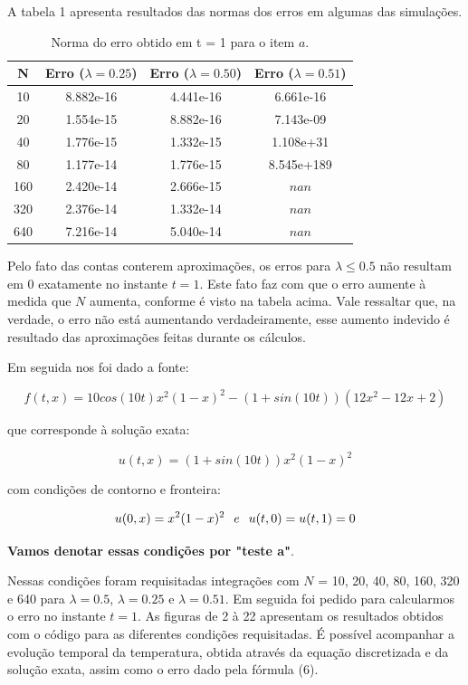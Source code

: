 \documentclass[a4paper, 12pt]{article}
\begin{document}
A tabela 1 apresenta resultados das normas dos erros em algumas das simulações.

\begin{table}[!h]
    \centering
    \begin{tabular}{|c|c|c|c|}
    \hline                               %
    N & Erro ($\lambda = 0.25$) & Erro ($\lambda = 0.50$) & Erro ($\lambda = 0.51$) \\
    \hline
    10  &  8.882e-16 & 4.441e-16 & 6.661e-16 \\
    20  &  1.554e-15 & 8.882e-16 & 7.143e-09 \\
    40  &  1.776e-15 & 1.332e-15 & 1.108e+31 \\
    80  &  1.177e-14 & 1.776e-15 & 8.545e+189 \\
    160 &  2.420e-14 & 2.666e-15 & $nan$ \\
    320 &  2.376e-14 & 1.332e-14 & $nan$ \\
    640 &  7.216e-14 & 5.040e-14 & $nan$ \\
    \hline
    \end{tabular}
    \caption{Norma do erro obtido em t = 1 para o item $a$.}
\end{table}

Pelo fato das contas conterem aproximações, os erros para $\lambda \leq 0.5$ não resultam em 0 exatamente no instante $t=1$. Este fato faz com que o erro aumente à medida que $N$ aumenta, conforme é visto na tabela acima. Vale ressaltar que, na verdade, o erro não está aumentando verdadeiramente, esse aumento indevido é resultado das aproximações feitas durante os cálculos.

Em seguida nos foi dado a fonte:

$$f(t, x) = 10cos(10t)x^{2}(1-x)^{2}-(1+sin(10t))(12x^{2}-12x+2)$$

que corresponde à solução exata:

$$u(t, x) = (1+sin(10t))x^{2}(1-x)^{2}$$

com condições de contorno e fronteira:

$$u(0,x) = x^{2}(1-x)^{2} \hspace{0.25cm} e \hspace{0.25cm} u(t,0) = u(t,1) = 0$$

\textbf{Vamos denotar essas condições por "teste a"}.

Nessas condições foram requisitadas integrações com $N$ = 10, 20, 40, 80, 160, 320 e 640 para $\lambda = 0.5$, $\lambda = 0.25$ e $\lambda= 0.51$. Em seguida foi pedido para calcularmos o erro no instante $t=1$. As figuras de 2 à 22 apresentam os resultados obtidos com o código para as diferentes condições requisitadas. É possível acompanhar a evolução temporal da temperatura, obtida através da equação discretizada e da solução exata, assim como o erro dado pela fórmula (6).
\end{document}
